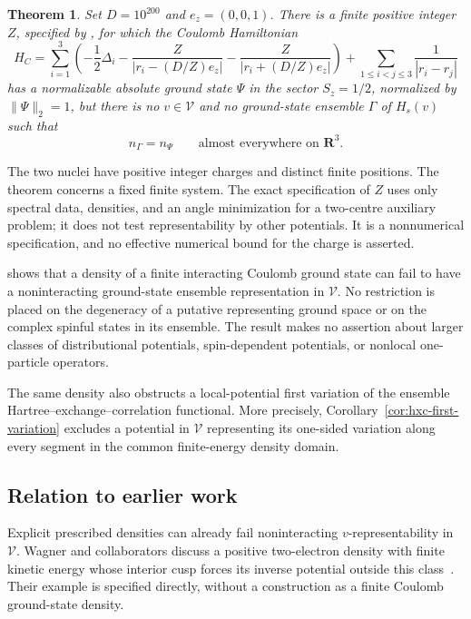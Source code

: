 \documentclass[11pt,a4paper]{article}
\newcommand{\R}{\mathbf R}
\newtheorem{theorem}{Theorem}[section]
\theoremstyle{definition}
\theoremstyle{remark}
\numberwithin{equation}{section}
\begin{document}
\begin{theorem}
\label{thm:main}
Set \(D=10^{200}\) and \(e_z=(0,0,1)\).
There is a finite positive integer \(Z\), specified by
, for which the Coulomb Hamiltonian
\[
H_C=\sum_{i=1}^3
\left(-\frac12\Delta_i
-\frac{Z}{|r_i-(D/Z)e_z|}
-\frac{Z}{|r_i+(D/Z)e_z|}\right)
+\sum_{1\le i<j\le3}\frac1{|r_i-r_j|}
\]
has a normalizable absolute ground state \(\Psi\) in the sector
\(S_z=1/2\), normalized by \(\|\Psi\|_2=1\), but there is no
\(v\in\mathcal V\) and no ground-state
ensemble \(\Gamma\) of \(H_s(v)\) such that
\[
n_\Gamma=n_\Psi\qquad\text{almost everywhere on }\R^3.
\]
\end{theorem}

The two nuclei have positive integer charges and distinct finite
positions. The theorem concerns a fixed finite system. The exact
specification of \(Z\) uses only spectral data, densities, and an angle
minimization for a two-centre auxiliary problem; it does not test
representability by other potentials. It is a nonnumerical
specification, and no effective numerical bound for the charge is
asserted.

 shows that a density of a finite interacting Coulomb
ground state can fail to have a noninteracting ground-state ensemble
representation in \(\mathcal V\).
No restriction is placed on the degeneracy of a
putative representing ground space or on the complex spinful states
in its ensemble. The result makes no assertion about larger classes
of distributional potentials, spin-dependent potentials, or nonlocal
one-particle operators.

The same density also obstructs a local-potential first variation of the
ensemble Hartree--exchange--correlation functional.  More precisely,
Corollary~\ref{cor:hxc-first-variation} excludes a potential in \(\mathcal V\)
representing its one-sided variation along every segment in the common
finite-energy density domain.

\subsection{Relation to earlier work}

Explicit prescribed densities can already fail noninteracting
\(v\)-representability in \(\mathcal V\).
Wagner and collaborators discuss a positive two-electron density
with finite kinetic energy whose interior cusp forces its inverse
potential outside this class~\cite[Section~IV.G, Eq.~(36)]{WBSBW14}.
Their example is specified directly, without a construction as a
finite Coulomb ground-state density.
\end{document}
